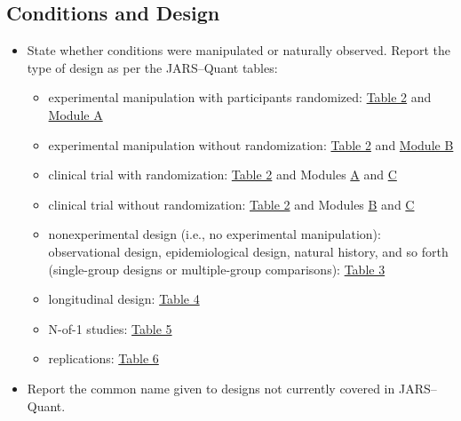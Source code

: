 \documentclass[acmsmall,screen,anonymous,review]{acmart}
\begin{document}
\subsection{Conditions and Design}

\begin{itemize}
    \item State whether conditions were manipulated or naturally observed. Report the type of design as per the JARS–Quant tables:
    \begin{itemize}
        \item experimental manipulation with participants randomized: \href{https://apastyle.apa.org/jars/quant-table-2.pdf}{Table 2} and \href{https://apastyle.apa.org/jars/quant-table-2a.pdf}{Module A}
        \item experimental manipulation without randomization: \href{https://apastyle.apa.org/jars/quant-table-2.pdf}{Table 2} and \href{https://apastyle.apa.org/jars/quant-table-2b.pdf}{Module B}
        \item clinical trial with randomization: \href{https://apastyle.apa.org/jars/quant-table-2.pdf}{Table 2} and Modules \href{https://apastyle.apa.org/jars/quant-table-2a.pdf}{A} and \href{https://apastyle.apa.org/jars/quant-table-2c.pdf}{C}
        \item clinical trial without randomization: \href{https://apastyle.apa.org/jars/quant-table-2.pdf}{Table 2} and Modules \href{https://apastyle.apa.org/jars/quant-table-2b.pdf}{B} and \href{https://apastyle.apa.org/jars/quant-table-2c.pdf}{C}
        \item nonexperimental design (i.e., no experimental manipulation): observational design, epidemiological design, natural history, and so forth (single-group designs or multiple-group comparisons): \href{https://apastyle.apa.org/jars/quant-table-3.pdf}{Table 3}
        \item longitudinal design: \href{https://apastyle.apa.org/jars/quant-table-4.pdf}{Table 4}
        \item N-of-1 studies: \href{https://apastyle.apa.org/jars/quant-table-5.pdf}{Table 5}
        \item replications: \href{https://apastyle.apa.org/jars/quant-table-6.pdf}{Table 6}
    \end{itemize}

    \item Report the common name given to designs not currently covered in JARS–Quant.
\end{itemize}
\end{document}

